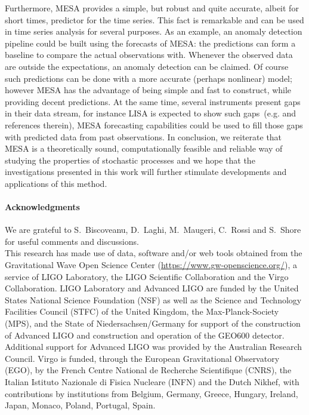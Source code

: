 \documentclass{aa}
\begin{document}
Furthermore, MESA provides a simple, but robust and quite accurate, albeit for short times, predictor for the time series. This fact is remarkable and can be used in time series analysis for several purposes. As an example, an anomaly detection pipeline could be built using the forecasts of MESA: the predictions can form a baseline to compare the actual observations with. Whenever the observed data are outside the expectations, an anomaly detection can be claimed. Of course such predictions can be done with a more accurate (perhaps nonlinear) model; however MESA has the advantage of being simple and fast to construct, while providing decent predictions. At the same time, several instruments present gaps in their data stream, for instance LISA is expected to show such gaps~(e.g. \citet{lisa_gaps} and references therein), MESA forecasting capabilities could be used to fill those gaps with predicted data from past observations. In conclusion, we reiterate that MESA is a theoretically sound, computationally feasible and reliable way of studying the properties of stochastic processes and we hope that the investigations presented in this work will further stimulate developments and applications of this method.

\paragraph{Acknowledgments}
We are grateful to S.~Biscoveanu, D.~Laghi, M.~Maugeri, C.~Rossi and S.~Shore for useful comments and discussions.\\
This research has made use of data, software and/or web tools obtained from the Gravitational Wave Open Science Center (\url{https://www.gw-openscience.org/}), a service of LIGO Laboratory, the LIGO Scientific Collaboration and the Virgo Collaboration. LIGO Laboratory and Advanced LIGO are funded by the United States National Science Foundation (NSF) as well as the Science and Technology Facilities Council (STFC) of the United Kingdom, the Max-Planck-Society (MPS), and the State of Niedersachsen/Germany for support of the construction of Advanced LIGO and construction and operation of the GEO600 detector. Additional support for Advanced LIGO was provided by the Australian Research Council. Virgo is funded, through the European Gravitational Observatory (EGO), by the French Centre National de Recherche Scientifique (CNRS), the Italian Istituto Nazionale di Fisica Nucleare (INFN) and the Dutch Nikhef, with contributions by institutions from Belgium, Germany, Greece, Hungary, Ireland, Japan, Monaco, Poland, Portugal, Spain.
\end{document}
